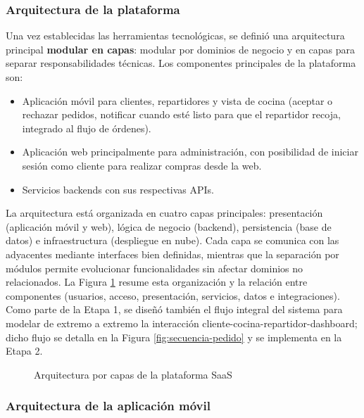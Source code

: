   \subsubsection{Arquitectura de la plataforma}

  Una vez establecidas las herramientas tecnológicas, se definió una arquitectura principal \textbf{modular en capas}: modular por dominios de negocio y en capas para separar responsabilidades técnicas. Los componentes principales de la plataforma son:
  \begin{itemize}
    \item Aplicación móvil para clientes, repartidores y vista de cocina (aceptar o rechazar pedidos, notificar cuando esté listo para que el repartidor recoja, integrado al flujo de órdenes).
    \item Aplicación web principalmente para administración, con posibilidad de iniciar sesión como cliente para realizar compras desde la web.
    \item Servicios backends con sus respectivas APIs.
  \end{itemize}

  La arquitectura está organizada en cuatro capas principales: presentación (aplicación móvil y web), lógica de negocio (backend), persistencia (base de datos) e infraestructura (despliegue en nube). Cada capa se comunica con las adyacentes mediante interfaces bien definidas, mientras que la separación por módulos permite evolucionar funcionalidades sin afectar dominios no relacionados. La Figura \ref{fig:arquitectura-capas} resume esta organización y la relación entre componentes (usuarios, acceso, presentación, servicios, datos e integraciones).
  Como parte de la Etapa 1, se diseñó también el flujo integral del sistema para modelar de extremo a extremo la interacción cliente-cocina-repartidor-dashboard; dicho flujo se detalla en la Figura \ref{fig:secuencia-pedido} y se implementa en la Etapa 2.
  \begin{figure}[htbp]
  \centering
  \resizebox{0.68\textwidth}{!}{}
  \caption[Arquitectura por capas]{Arquitectura por capas de la plataforma SaaS}
  \label{fig:arquitectura-capas}
  \end{figure}

  \subsubsection{Arquitectura de la aplicación móvil}

